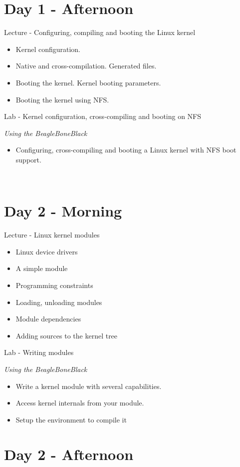 \documentclass[a4paper,12pt,obeyspaces,spaces,hyphens]{article}
\begin{document}
\section{Day 1 - Afternoon}
\feagendatwocolumn
{Lecture - Configuring, compiling and booting the Linux kernel}
{
  \begin{itemize}
  \item Kernel configuration.
  \item Native and cross-compilation. Generated files.
  \item Booting the kernel. Kernel booting parameters.
  \item Booting the kernel using NFS.
  \end{itemize}
}
{Lab - Kernel configuration, cross-compiling and booting on NFS}
{
  {\em Using the BeagleBoneBlack}
  \begin{itemize}
  \item Configuring, cross-compiling and booting a Linux kernel with
    NFS boot support.
  \end{itemize}
}
\\
\section{Day 2 - Morning}

\feagendatwocolumn
{Lecture - Linux kernel modules}
{
  \begin{itemize}
  \item Linux device drivers
  \item A simple module
  \item Programming constraints
  \item Loading, unloading modules
  \item Module dependencies
  \item Adding sources to the kernel tree
  \end{itemize}
}
{Lab - Writing modules}
{
  {\em Using the BeagleBoneBlack}
  \begin{itemize}
  \item Write a kernel module with several capabilities.
  \item Access kernel internals from your module.
  \item Setup the environment to compile it
  \end{itemize}
}

\section{Day 2 - Afternoon}
\end{document}
